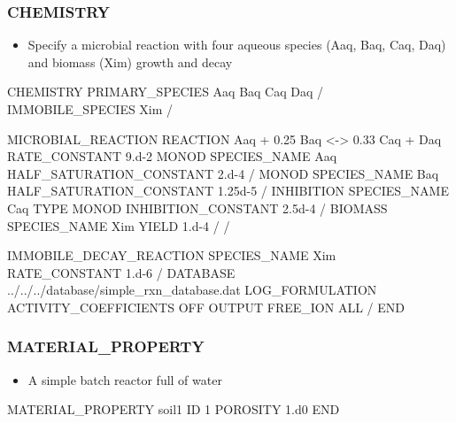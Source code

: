 \documentclass{beamer}
\begin{document}
\begin{frame}\frametitle{CHEMISTRY}

\begin{itemize}
  \item Specify a microbial reaction with four aqueous species (Aaq, Baq, Caq, Daq) and biomass (Xim) growth and decay
\end{itemize}

\begin{semiverbatim}

CHEMISTRY
  PRIMARY_SPECIES
    Aaq
    Baq
    Caq
    Daq
  /
  IMMOBILE_SPECIES
    Xim
  /
\end{semiverbatim}
\newpage
\scriptsize
\begin{semiverbatim}
  MICROBIAL_REACTION
    REACTION Aaq + 0.25 Baq <-> 0.33 Caq + Daq
    RATE_CONSTANT 9.d-2
    MONOD
      SPECIES_NAME Aaq
      HALF_SATURATION_CONSTANT 2.d-4
    /
    MONOD
      SPECIES_NAME Baq
      HALF_SATURATION_CONSTANT 1.25d-5
    /
    INHIBITION
      SPECIES_NAME Caq
      TYPE MONOD
      INHIBITION_CONSTANT 2.5d-4
    /
    BIOMASS
      SPECIES_NAME Xim
      YIELD 1.d-4
    /
  /
\end{semiverbatim}
\normalsize
\begin{semiverbatim}
  IMMOBILE_DECAY_REACTION
    SPECIES_NAME Xim
    RATE_CONSTANT 1.d-6
  /
  DATABASE ../../../database/simple_rxn_database.dat
  LOG_FORMULATION
  ACTIVITY_COEFFICIENTS OFF
  OUTPUT
    FREE_ION
    ALL
  /
END
\end{semiverbatim}

\end{frame}


\begin{frame}[fragile]\frametitle{MATERIAL\_PROPERTY}

\begin{itemize}
  \item A simple batch reactor full of water
\end{itemize}

\begin{semiverbatim}


MATERIAL_PROPERTY soil1
  ID 1
  POROSITY 1.d0
END
\end{semiverbatim}

\end{frame}
\end{document}
